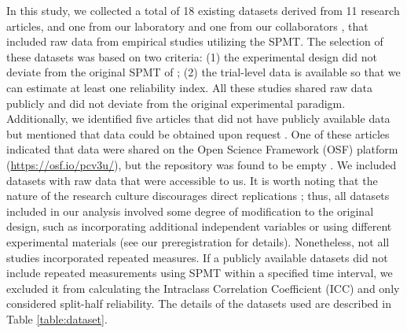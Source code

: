 \documentclass[sn-apa]{sn-jnl}%
\theoremstyle{thmstyleone}%
\theoremstyle{thmstyletwo}%
\theoremstyle{thmstylethree}%
\begin{document}
In this study, we collected a total of 18 existing datasets derived from 11 research articles, and one from our laboratory \parencite{hu2023data} and one from our collaborators \parencite{liu2023to}, that included raw data from empirical studies utilizing the SPMT. The selection of these datasets was based on two criteria: (1) the experimental design did not deviate from the original SPMT of \textcite{sui2012perceptual}; (2) the trial-level data is available so that we can estimate at least one reliability index. All these studies shared raw data publicly \parencite{golubickis2021judging,navon2021are,qian2020prioritised,schafer2019understanding,svensson2022more} and did not deviate from the original experimental paradigm. Additionally, we identified five articles that did not have publicly available data but mentioned that data could be obtained upon request \parencite{bukowski2021socio,cheng2019saliency,kolvoort2020temporal,martinez2020examining,xu2021romantic}. One of these articles indicated that data were shared on the Open Science Framework (OSF) platform (\url{https://osf.io/pcv3u/}), but the repository was found to be empty \parencite{bukowski2021socio}. We included datasets with raw data that were accessible to us. It is worth noting that the nature of the research culture discourages direct replications \parencite{makel2012replications}; thus, all datasets included in our analysis involved some degree of modification to the original design, such as incorporating additional independent variables or using different experimental materials (see our preregistration for details). Nonetheless, not all studies incorporated repeated measures. If a publicly available datasets did not include repeated  measurements using SPMT within a specified time interval, we excluded it from calculating the Intraclass Correlation Coefficient (ICC) and only considered split-half reliability. The details of the datasets used are described in Table \ref{table:dataset}.
\end{document}
